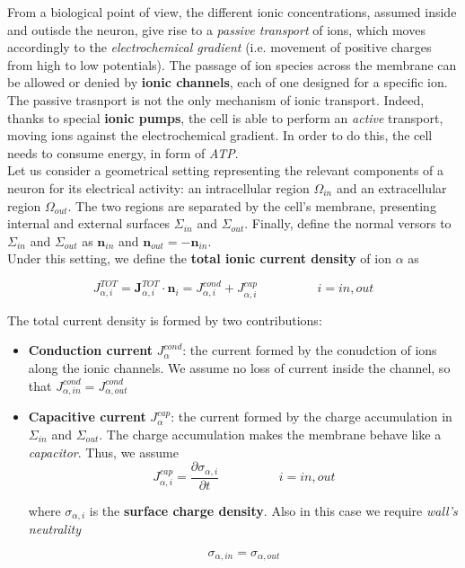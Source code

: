 \documentclass[a4paper]{article}
\begin{document}
From a biological point of view, the different ionic concentrations, assumed inside and outisde the neuron, give rise to a \textit{passive transport} of ions, which moves accordingly to the \textit{electrochemical gradient} (i.e. movement of positive charges from high to low potentials). The passage of ion species across the membrane can be allowed or denied by \textbf{ionic channels}, each of one designed  for a specific ion. The passive trasnport is not the only mechanism of ionic transport. Indeed, thanks to special \textbf{ionic pumps}, the cell is able to perform an \textit{active} transport, moving ions against the electrochemical gradient. In order to do this, the cell needs to consume energy, in form of \textit{ATP}.\\
Let us consider a geometrical setting representing the relevant components of a neuron for its electrical activity: an intracellular region $ \Omega_{in}$ and an extracellular region $\Omega_{out}$. The two regions are separated by the cell's membrane, presenting internal and external surfaces $\Sigma_{in}$ and $\Sigma_{out}$. Finally, define the normal versors to  $\Sigma_{in}$ and $\Sigma_{out}$ as  $\textbf{n}_{in}$  and  $\textbf{n}_{out} = - \textbf{n}_{in}$.\\

Under this setting, we define the \textbf{total ionic current density} of ion $\alpha$ as

\begin{equation}
J_{\alpha,i}^{TOT} =	\textbf{J}_{\alpha,i}^{TOT} \cdot \textbf{n}_{i} = J^{cond}_{\alpha,i} + J^{cap}_{\alpha,i} \hspace{2cm} i= in,out
\end{equation}


The total current density is formed by two contributions:

\begin{itemize}
	
	\item \textbf{Conduction current} $J^{cond}_{\alpha}$: the current formed by the conudction of ions along the ionic channels. We assume no loss of current inside the channel, so that $J^{cond}_{\alpha, in} = J^{cond}_{\alpha, out}$
	
	\item \textbf{Capacitive current} $J^{cap}_{\alpha}$: the current formed by the charge accumulation in $\Sigma_{in}$ and $\Sigma_{out}$. The charge accumulation makes the membrane behave like a \textit{capacitor}. Thus, we assume 
	\begin{equation}
	J^{cap}_{\alpha,i} = \frac{\partial \sigma_{\alpha,i}}{\partial t}  \hspace{2cm} i= in,out
	\end{equation}
	
	where $\sigma_{\alpha,i}$ is the \textbf{surface charge density}. Also in this case we require \textit{wall's neutrality}
	
	\begin{equation}
	\sigma_{\alpha,in} = \sigma_{\alpha,out}
	\end{equation}
\end{itemize}	
\end{document}
